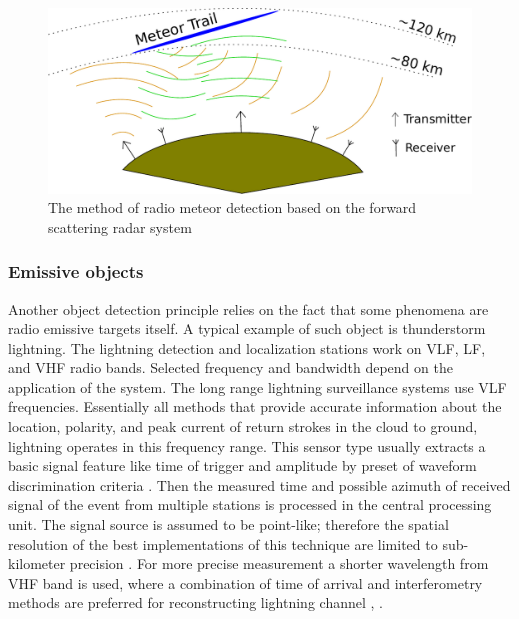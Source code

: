 \documentclass[twoside]{ctuthesis}
\theoremstyle{plain}
\theoremstyle{definition}
\theoremstyle{note}
\begin{document}
\begin{figure}
 \begin{center}
 \includegraphics[width=\linewidth]{./img/Meteor_detection.pdf}
 \caption{The method of radio meteor detection based on the forward scattering radar system}
  \label{fig:forward_scattering} 
 \end{center}
\end{figure}

\subsubsection{Emissive objects}

Another object detection principle relies on the fact that some phenomena are radio emissive targets itself. A typical example of such object is thunderstorm lightning. The lightning detection and localization stations work on VLF, LF, and VHF radio bands. Selected frequency and bandwidth depend on the application of the system. The long range lightning surveillance systems use VLF frequencies. Essentially all methods that provide accurate information about the location,  polarity,  and peak current of return strokes in the cloud to ground, lightning operates in this frequency range. This sensor type usually extracts a basic signal feature like time of trigger and amplitude by preset of waveform discrimination criteria \cite{VLF_TOGA}. Then the measured time and possible azimuth of received signal of the event from multiple stations is processed in the central processing unit. The signal source is assumed to be point-like; therefore the spatial resolution of the best implementations of this technique are limited to sub-kilometer precision \cite{Lightning_locating}. 
For more precise measurement a shorter wavelength from VHF band is used, where a combination of time of arrival and interferometry methods are preferred for reconstructing lightning channel \cite{NALMA_algorithms}, \cite{rocket_triggered}. 
\end{document}
